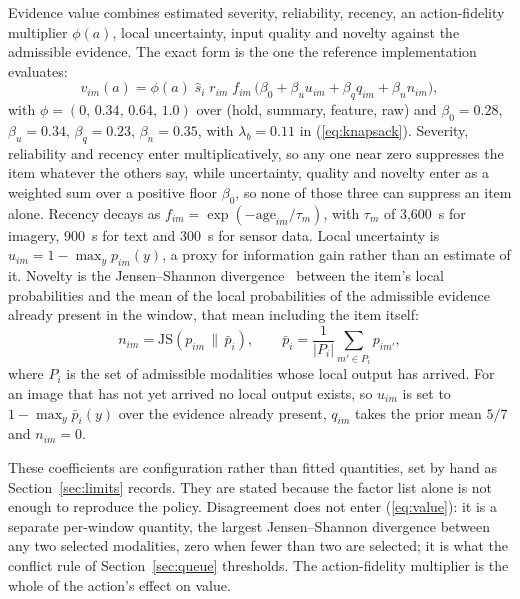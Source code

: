 \documentclass[conference,a4paper]{IEEEtran}
\newif\ifsubmission
\newcommand{\masteronly}[1]{\ifsubmission\else#1\fi}
\begin{document}
Evidence value combines estimated severity, reliability, recency, an action-fidelity
multiplier $\phi(a)$, local uncertainty, input quality and novelty against the
admissible evidence. The exact form is the one the reference implementation evaluates:
\begin{equation}
\label{eq:value}
v_{im}(a)=\phi(a)\;\hat s_i\; r_{im}\; f_{im}\,\big(\beta_0+\beta_u u_{im}+\beta_q q_{im}+\beta_n n_{im}\big),
\end{equation}
with $\phi=(0,\,0.34,\,0.64,\,1.0)$ over (hold, summary, feature, raw) and
$\beta_0=0.28$, $\beta_u=0.34$, $\beta_q=0.23$, $\beta_n=0.35$, with $\lambda_b=0.11$ in (\ref{eq:knapsack}). Severity, reliability and recency enter multiplicatively, so any one near zero suppresses the item whatever the others say, while uncertainty, quality and novelty enter as a weighted sum over a positive floor $\beta_0$, so none of those three can suppress an item alone. Recency decays as $f_{im}=\exp(-\mathrm{age}_{im}/\tau_m)$, with $\tau_m$ of 3,600~s for imagery, 900~s for text and 300~s for sensor data. Local uncertainty is $u_{im}=1-\max_y p_{im}(y)$, a proxy for information gain rather than an estimate of it. Novelty is the Jensen--Shannon divergence~\cite{lin} between the item's local
probabilities and the mean of the local probabilities of the admissible evidence already
present in the window, that mean including the item itself:
\begin{equation}
\label{eq:js}
n_{im}=\mathrm{JS}\!\left(p_{im}\,\Big\|\,\bar p_i\right),\qquad
\bar p_i=\frac{1}{|P_i|}\sum_{m'\in P_i} p_{im'},
\end{equation}
where $P_i$ is the set of admissible modalities whose local output has arrived. For an image
that has not yet arrived no local output exists, so $u_{im}$ is set to $1-\max_y \bar p_i(y)$ over the
evidence already present, $q_{im}$ takes the prior mean $5/7$ and $n_{im}=0$.

These coefficients are configuration rather than fitted quantities, set by hand as Section~\ref{sec:limits} records.\masteronly{ They are stated because the factor list alone is not enough to reproduce the policy.} Disagreement does not enter (\ref{eq:value}): it is a separate per-window quantity, the largest Jensen--Shannon divergence between any two selected modalities, zero when fewer than two are selected; it is what the conflict rule of Section~\ref{sec:queue} thresholds. The action-fidelity multiplier is the whole of the action's effect on value.
\end{document}
